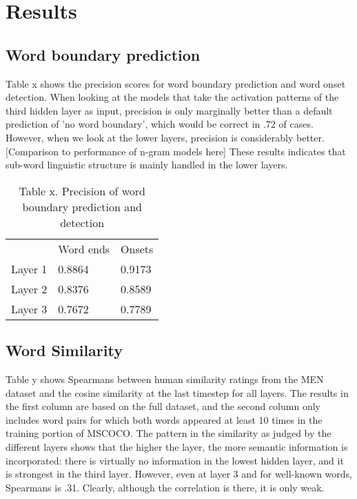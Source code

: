 \section{Results}
\label{sec:results}

\subsection{Word boundary prediction}
Table x shows the precision scores for word boundary prediction and word onset detection. When looking at the models that take the activation patterns of the third hidden layer as input, precision is only marginally better than a default prediction of 'no word boundary', which would be correct in .72 of cases. %
However, when we look at the lower layers, precision is considerably better. [Comparison to performance of n-gram models here]
These results indicates that sub-word linguistic structure is mainly handled in the lower layers.

\begin{table}[]
	\centering
	\caption{Table x. Precision of word boundary prediction and detection}
	\begin{tabular}{lll}
		& Word ends      & Onsets         \\
		Layer 1 & 0.8864   & 0.9173 \\
		Layer 2 & 0.8376  & 0.8589 \\
		Layer 3 & 0.7672 & 0.7789
	\end{tabular}
\end{table}

\subsection{Word Similarity} %
Table y shows Spearmans \rho between human similarity ratings from the MEN dataset and the cosine similarity at the last timestep for all layers. The results in the first column are based on the full dataset, and the second column only includes word pairs for which both words appeared at least 10 times in the training portion of MSCOCO.
The pattern in the similarity as judged by the different layers shows that the higher the layer, the more semantic information is incorporated: there is virtually no information in the lowest hidden layer, and it is strongest in the third layer. However, even at layer 3 and for well-known words, Spearmans \rho is .31. Clearly, although the correlation is there, it is only weak.  %

